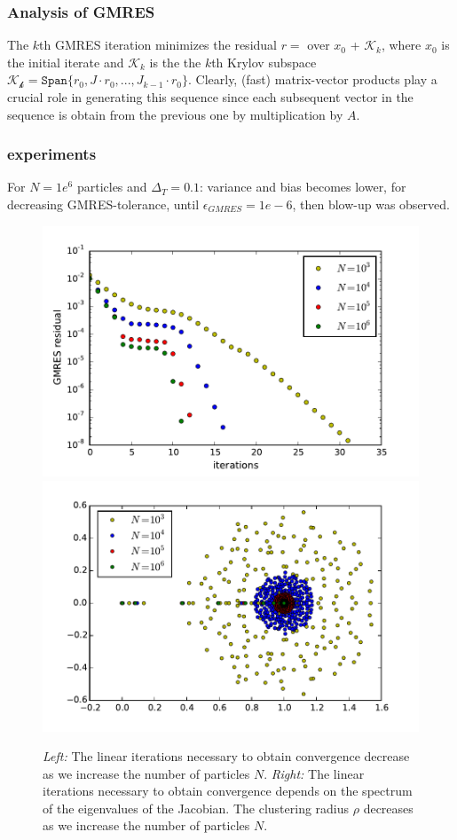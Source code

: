\subsubsection{Analysis of GMRES} \label{GMRES}

The $k$th GMRES iteration minimizes the residual $r= $ over $x_0$ + $\mathcal{K}_k$, where $x_0$ is the initial iterate and $\mathcal{K}_k$ is the the $k$th Krylov subspace
$\mathcal{K_k} = \texttt{Span} \{ r_0, J \cdot r_0, . . . , J_{k-1} \cdot r_0 \}$.
Clearly, (fast) matrix-vector products play a crucial role in generating this sequence since each subsequent vector in the sequence is obtain from the previous one by multiplication by $A$.

\subsubsection{experiments}
For $N=1e^6$ particles and $\Delta_T =0.1$: variance and bias becomes lower, for decreasing GMRES-tolerance, until $\epsilon_{GMRES}= 1e-6$, then blow-up was observed.

\begin{figure}
\includegraphics[width=0.5\linewidth]{../Problems/WeightedParticles/checkSystem/plots/GMRES/GMRES_N_Dt_1e-1}
\includegraphics[width=0.5\linewidth]{../Problems/WeightedParticles/checkSystem/plots/GMRES/Spectrum_Dt_1e-1}
\caption{
\textit{Left:} The linear iterations necessary to
obtain convergence decrease as we increase the number of particles  $N$.
\textit{Right:} The linear iterations necessary to
obtain convergence depends on the spectrum of the eigenvalues of the Jacobian. The clustering radius $\rho$ decreases as we increase the number of particles  $N$.
} 
\label{fig:Spectrum_Dt_1e-1}
\end{figure}



